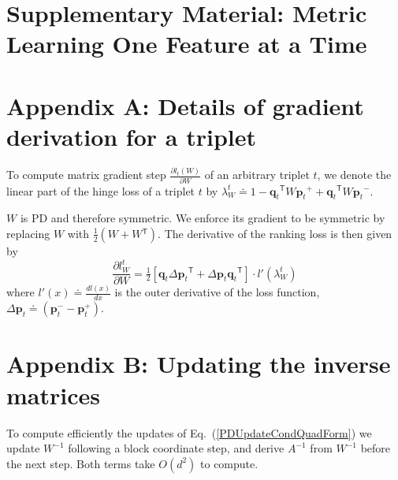 \documentclass{article} %
\newcommand\mat[1]{{#1}}
\renewcommand\vec[1]{\mathbf{#1}}
\newcommand{\T}{{}^\mathsf{T}}
\newcommand{\W}{\mat{W}}
\newcommand{\eqdef}{\doteq}
\newcommand{\q}{{\vec{q}}}
\newcommand{\p}{{\vec{p}}}
\newcommand{\trip}{{t}}
\newcommand{\qt}{{\q_{\trip}}}
\newcommand{\pt}{{\p_{\trip}}}
\newcommand{\invA}{A^{-1}}
\renewcommand{\eqref}[1]{Eq.~(\ref{#1})}
\begin{document}
\section*{Supplementary Material: Metric Learning One Feature at a Time}

\appendix
\section*{Appendix A: Details of gradient derivation for a triplet}
\label{appendix-grad}

To compute matrix gradient step $\frac{\partial {l_t (\W)}}{\partial \W}$ of an arbitrary triplet $t$, we denote the linear part of the hinge loss of a triplet $t$ by $\lambda_{W}^t \eqdef 
1-\qt\T \W \pt^{+} + \qt\T\W\pt^{-}.$

$\W$ is PD and therefore symmetric. We enforce its gradient to be symmetric by replacing $\W$ with $\tfrac{1}{2}(\W + \W\T)$.
The derivative of the ranking loss is then given by
\begin{equation}
\frac{\partial {l_{\W}^{t}}}{\partial \W} = \tfrac{1}{2}[\vec{q}_{t}\Delta\vec{p}_{t}\T  + \Delta\vec{p}_{t}\vec{q}_{t}\T]\cdot {l'}(\lambda_{W}^t)
\label{dlossranking}
\nonumber 
\end{equation} where $l'(x) \eqdef \frac{d{l(x)}}{dx}$ is the outer derivative of the loss function, $\Delta\vec{p}_{t} \eqdef (\vec{p}_{t}^{-} - \vec{p}_{t}^{+})$.

\section*{Appendix B: Updating the inverse matrices}
\label{appendix-inverse}

To compute efficiently the updates of \eqref{PDUpdateCondQuadForm} we update $\W^{-1}$ following a block coordinate step, and derive $\invA$ from $\W^{-1}$ before the next step. Both terms take $O(d^2)$ to compute.
\end{document}
